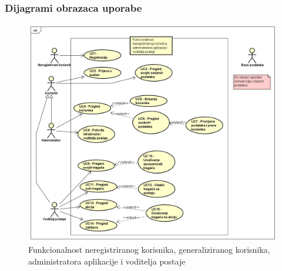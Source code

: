 					
					
				\subsubsection{Dijagrami obrazaca uporabe}
					
					\textit{}
				
					\begin{figure}[H]
						\includegraphics[scale=0.8]{slike/dijagram admin.png} %
						\centering
						\caption{Funkcionalnost neregistriranog korisnika, generaliziranog korisnika, administratora aplikacije i voditelja postaje}
						\label{fig:Funkcionalnost neregistriranog korisnika, administratora aplikacije i voditelja postaje}
					\end{figure}
					
